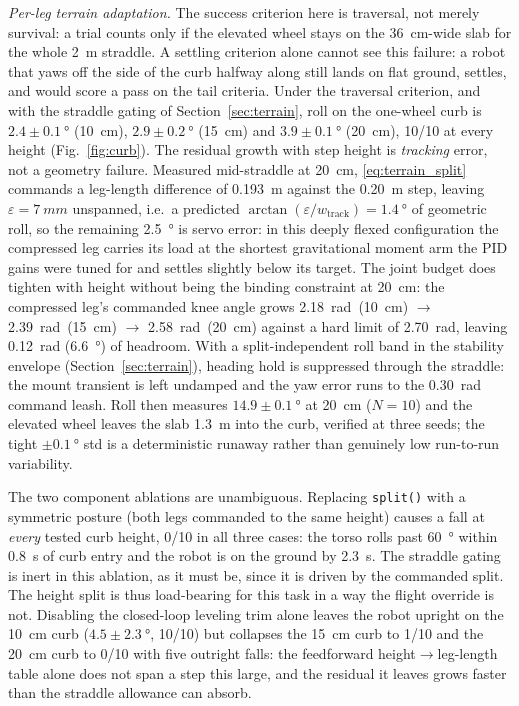 \documentclass[a4paper,fleqn]{cas-dc}
\begin{document}
\emph{Per-leg terrain adaptation.}
The success criterion here is traversal, not merely survival: a trial counts
only if the elevated wheel stays on the \SI{36}{cm}-wide slab for the whole
\SI{2}{m} straddle. A settling criterion alone cannot see this failure: a robot that yaws off the side of the curb halfway along still lands on flat ground,
settles, and would score a pass on the tail criteria. Under the traversal
criterion, and with the straddle gating of Section~\ref{sec:terrain}, roll on the
one-wheel curb is $2.4{\pm}\SI{0.1}{\degree}$ (\SI{10}{cm}),
$2.9{\pm}\SI{0.2}{\degree}$ (\SI{15}{cm}) and $3.9{\pm}\SI{0.1}{\degree}$
(\SI{20}{cm}), \num{10}/\num{10} at every height (Fig.~\ref{fig:curb}).
The residual growth with step height is \emph{tracking} error, not a geometry
failure. Measured mid-straddle at \SI{20}{cm}, \eqref{eq:terrain_split} commands
a leg-length difference of \SI{0.193}{m} against the \SI{0.20}{m} step, leaving
$\varepsilon{=}\SI{7}{mm}$ unspanned, i.e.\ a predicted
$\arctan(\varepsilon/w_{\text{track}}){=}\SI{1.4}{\degree}$ of geometric roll, so
the remaining \SI{2.5}{\degree} is
servo error: in this deeply flexed configuration the compressed leg carries its
load at the shortest gravitational moment arm the PID gains were tuned for and
settles slightly below its target. The joint budget does tighten with height
without being the binding constraint at \SI{20}{cm}: the compressed leg's
commanded knee angle grows \SI{2.18}{rad}~(\SI{10}{cm}) $\rightarrow$
\SI{2.39}{rad}~(\SI{15}{cm}) $\rightarrow$ \SI{2.58}{rad}~(\SI{20}{cm}) against
a hard limit of \SI{2.70}{rad}, leaving \SI{0.12}{rad} (\SI{6.6}{\degree}) of
headroom.
With a split-independent roll band in the stability envelope
(Section~\ref{sec:terrain}), heading hold is suppressed through the straddle: the
mount transient is left undamped and the yaw error runs to the
\SI{0.30}{rad} command leash. Roll then measures $14.9{\pm}\SI{0.1}{\degree}$ at
\SI{20}{cm} ($N{=}10$) and the elevated wheel leaves the slab \SI{1.3}{m} into
the curb, verified at three seeds; the tight $\pm\SI{0.1}{\degree}$ std is a
deterministic runaway rather than genuinely low run-to-run variability.

The two component ablations are unambiguous. Replacing \texttt{split()} with a
symmetric posture (both legs commanded to the same height) causes a fall at \emph{every} tested curb height, \num{0}/\num{10} in
all three cases: the torso rolls past \SI{60}{\degree} within \SI{0.8}{s} of
curb entry and the robot is on the ground by \SI{2.3}{s}. The straddle gating is
inert in this ablation, as it must be, since it is driven by the commanded
split. The height split is thus load-bearing for this task in a way the flight
override is not. Disabling the closed-loop leveling trim alone leaves the robot
upright on the \SI{10}{cm} curb ($4.5{\pm}\SI{2.3}{\degree}$, \num{10}/\num{10})
but collapses the \SI{15}{cm} curb to \num{1}/\num{10} and the \SI{20}{cm} curb
to \num{0}/\num{10} with five outright falls: the feedforward height$\rightarrow$leg-length table alone does not span a step this large, and
the residual it leaves grows faster than the straddle allowance can absorb.
\end{document}
